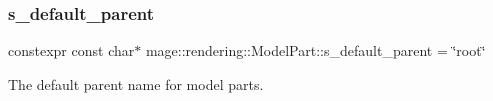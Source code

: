 \subsubsection{\texorpdfstring{s\+\_\+default\+\_\+parent}{s\_default\_parent}}
{\footnotesize\ttfamily constexpr const char$\ast$ mage\+::rendering\+::\+Model\+Part\+::s\+\_\+default\+\_\+parent = \char`\"{}root\char`\"{}\hspace{0.3cm}{\ttfamily [static]}}

The default parent name for model parts. 